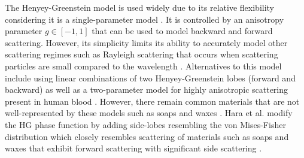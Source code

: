 The Henyey-Greenstein model is used widely due to its relative flexibility considering it is a single-parameter model \cite{henyey1940diffuse}. It is controlled by an anisotropy parameter $g \in [-1, 1]$ that can be used to model backward and forward scattering. However, its simplicity limits its ability to accurately model other scattering regimes such as Rayleigh scattering that occurs when scattering particles are small compared to the wavelength \cite{cornette1992physically, rayleigh1899xxxiv}. Alternatives to this model include using linear combinations of two Henyey-Greenstein lobes (forward and backward) as well as a two-parameter model for highly anisotropic scattering present in human blood \cite{reynolds1980approximate}. However, there remain common materials that are not well-represented by these models such as soaps and waxes \cite{gkioulekas2013understanding}. Hara et al. modify the HG phase function by adding side-lobes resembling the von Mises-Fisher distribution which closely resembles scattering of materials such as soaps and waxes that exhibit forward scattering with significant side scattering \cite{fisher1953dispersion, hara2007mixture}.